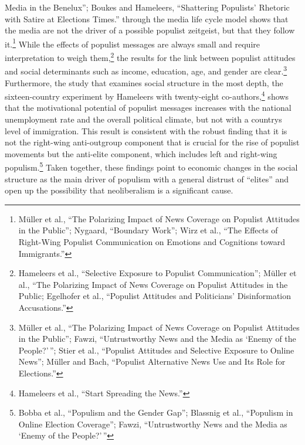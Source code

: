 \documentclass{tufte-handout}
\begin{document}
{{{{{  Media in the Benelux''; Boukes and Hameleers, ``Shattering Populists'
  Rhetoric with Satire at Elections Times.''}  through
the media life cycle model shows that the media are not the driver of a
possible populist zeitgeist, but that they follow it.\footnote{Müller et
  al., ``The Polarizing Impact of News Coverage on Populist Attitudes in
  the Public''; Nygaard, ``Boundary Work''; Wirz et al., ``The Effects
  of Right-Wing Populist Communication on Emotions and Cognitions toward
  Immigrants.''} While the effects of populist messages are always small
and require interpretation to weigh them,\footnote{Hameleers et al.,
  ``Selective Exposure to Populist Communication''; Müller et al., ``The
  Polarizing Impact of News Coverage on Populist Attitudes in the
  Public; Egelhofer et al., ``Populist Attitudes and Politicians'
  Disinformation Accusations.''} the results for the link between
populist attitudes and social determinants such as income, education,
age, and gender are clear.\footnote{Müller et al., ``The Polarizing
  Impact of News Coverage on Populist Attitudes in the Public''; Fawzi,
  ``Untrustworthy News and the Media as `Enemy of the People?'\,'';
  Stier et al., ``Populist Attitudes and Selective Exposure to Online
  News''; Müller and Bach, ``Populist Alternative News Use and Its Role
  for Elections.''} Furthermore, the study that examines social
structure in the most depth, the sixteen-country experiment by Hameleers
with twenty-eight co-authors,\footnote{Hameleers et al., ``Start
  Spreading the News.''} shows that the motivational potential of
populist messages increases with the national unemployment rate and the
overall political climate, but not with a country\textquotesingle s
level of immigration. This result is consistent with the robust finding
that it is not the right-wing anti-outgroup component that is crucial
for the rise of populist movements but the anti-elite component, which
includes left and right-wing populism.\footnote{Bobba et al., ``Populism
  and the Gender Gap''; Blassnig et al., ``Populism in Online Election
  Coverage''; Fawzi, ``Untrustworthy News and the Media as `Enemy of the
  People?'\,''} Taken together, these findings point to economic changes
in the social structure as the main driver of populism with a general
distrust of ``elites'' and open up the possibility that neoliberalism is
a significant cause.

}}}}
\end{document}
